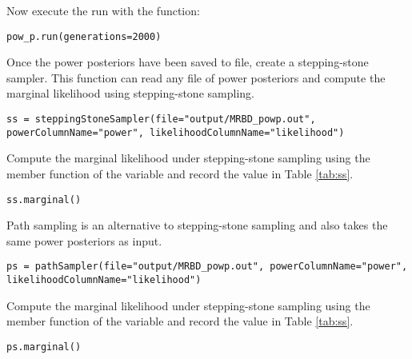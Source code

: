 Now execute the run with the  function:
{\tt \begin{snugshade*}
\begin{lstlisting}
pow_p.run(generations=2000)
\end{lstlisting}
\end{snugshade*}}

Once the power posteriors have been saved to file, create a stepping-stone sampler.
This function can read any file of power posteriors and compute the marginal likelihood using stepping-stone sampling.
{\tt \small \begin{snugshade*}
\begin{lstlisting}
ss = steppingStoneSampler(file="output/MRBD_powp.out", powerColumnName="power", likelihoodColumnName="likelihood")
\end{lstlisting}
\end{snugshade*}}

Compute the marginal likelihood under stepping-stone sampling using the member function  of the  variable and record the value in Table \ref{tab:ss}.
{\tt \begin{snugshade*}
\begin{lstlisting}
ss.marginal()
\end{lstlisting}
\end{snugshade*}}

Path sampling is an alternative to stepping-stone sampling and also takes the same power posteriors as input.
{\tt \small \begin{snugshade*}
\begin{lstlisting}
ps = pathSampler(file="output/MRBD_powp.out", powerColumnName="power", likelihoodColumnName="likelihood")
\end{lstlisting}
\end{snugshade*}}

Compute the marginal likelihood under stepping-stone sampling using the member function  of the  variable and record the value in Table \ref{tab:ss}.
{\tt \begin{snugshade*}
\begin{lstlisting}
ps.marginal()
\end{lstlisting}
\end{snugshade*}}




